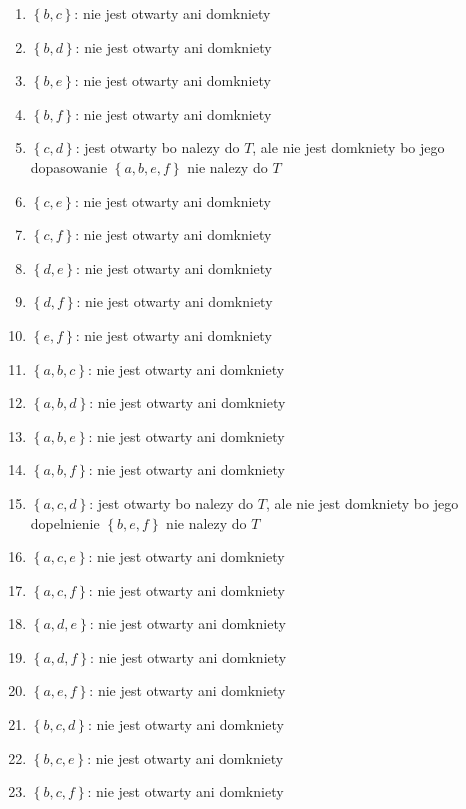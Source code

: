 \documentclass{article}
\begin{document}
\begin{enumerate}
\begin{enumerate}[label=\arabic*.]
\item $\left\{ b,c \right\}$: nie jest otwarty ani domkniety
\item $\left\{ b,d \right\}$: nie jest otwarty ani domkniety
\item $\left\{ b,e \right\}$: nie jest otwarty ani domkniety
\item $\left\{ b,f \right\}$: nie jest otwarty ani domkniety

\item $\left\{ c,d \right\}$: jest otwarty bo nalezy do $T$, ale nie jest domkniety bo jego dopasowanie $\left\{ a,b,e,f \right\}$ nie nalezy do $T$
\item $\left\{ c,e \right\}$: nie jest otwarty ani domkniety
\item $\left\{ c,f \right\}$: nie jest otwarty ani domkniety

\item $\left\{ d,e \right\}$: nie jest otwarty ani domkniety
\item $\left\{ d,f \right\}$: nie jest otwarty ani domkniety

\item $\left\{ e,f \right\}$: nie jest otwarty ani domkniety

\item $\left\{ a,b,c \right\}$: nie jest otwarty ani domkniety
\item $\left\{ a,b,d \right\}$: nie jest otwarty ani domkniety
\item $\left\{ a,b,e \right\}$: nie jest otwarty ani domkniety
\item $\left\{ a,b,f \right\}$: nie jest otwarty ani domkniety

\item $\left\{ a,c,d \right\}$: jest otwarty bo nalezy do $T$, ale nie jest domkniety bo jego dopelnienie $\left\{ b,e,f \right\}$ nie nalezy do $T$
\item $\left\{ a,c,e \right\}$: nie jest otwarty ani domkniety
\item $\left\{ a,c,f \right\}$: nie jest otwarty ani domkniety

\item $\left\{ a,d,e \right\}$: nie jest otwarty ani domkniety
\item $\left\{ a,d,f \right\}$: nie jest otwarty ani domkniety

\item $\left\{ a,e,f \right\}$: nie jest otwarty ani domkniety

\item $\left\{ b,c,d \right\}$: nie jest otwarty ani domkniety
\item $\left\{ b,c,e \right\}$: nie jest otwarty ani domkniety
\item $\left\{ b,c,f \right\}$: nie jest otwarty ani domkniety


\end{enumerate}
\end{enumerate}
\end{document}
